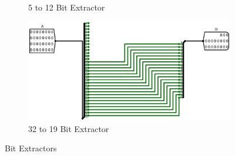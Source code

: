 \documentclass[12pt]{article}
\begin{document}
\begin{figure}[H]
\begin{subfigure}[b]{0.45\textwidth}
        \caption{5 to 12 Bit Extractor}
        \label{fig:5t12}
    \end{subfigure}
    \begin{subfigure}[b]{0.45\textwidth}
        \includegraphics[width=\textwidth]{Images/32to19.png}
        \caption{32 to 19 Bit Extractor}
        \label{fig:32t19}
    \end{subfigure}
    \caption{Bit Extractors}\label{fig:bitextract}
\end{figure}
\end{document}

